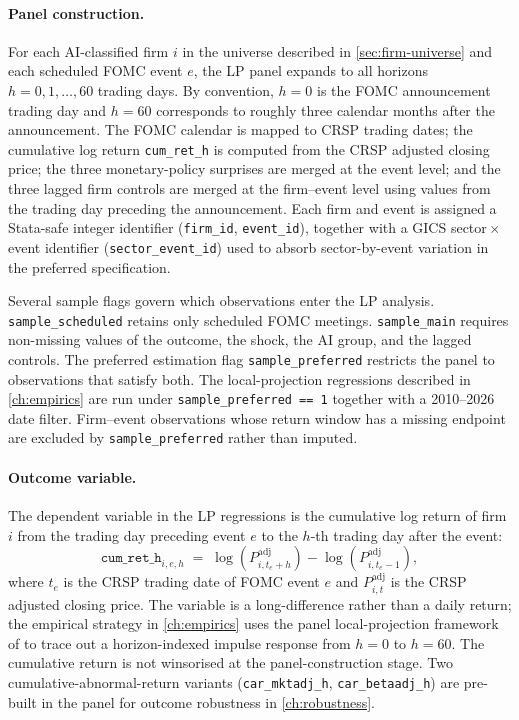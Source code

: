 \paragraph{Panel construction.} For each AI-classified firm $i$ in the universe described in \cref{sec:firm-universe} and each scheduled FOMC event $e$, the LP panel expands to all horizons $h = 0, 1, \dots, 60$ trading days. By convention, $h=0$ is the FOMC announcement trading day and $h=60$ corresponds to roughly three calendar months after the announcement. The FOMC calendar is mapped to CRSP trading dates; the cumulative log return \texttt{cum\_ret\_h} is computed from the CRSP adjusted closing price; the three monetary-policy surprises are merged at the event level; and the three lagged firm controls are merged at the firm--event level using values from the trading day preceding the announcement. Each firm and event is assigned a Stata-safe integer identifier (\texttt{firm\_id}, \texttt{event\_id}), together with a GICS sector\,$\times$\,event identifier (\texttt{sector\_event\_id}) used to absorb sector-by-event variation in the preferred specification.

Several sample flags govern which observations enter the LP analysis. \texttt{sample\_scheduled} retains only scheduled FOMC meetings. \texttt{sample\_main} requires non-missing values of the outcome, the shock, the AI group, and the lagged controls. The preferred estimation flag \texttt{sample\_preferred} restricts the panel to observations that satisfy both. The local-projection regressions described in \cref{ch:empirics} are run under \texttt{sample\_preferred == 1} together with a 2010--2026 date filter. Firm--event observations whose return window has a missing endpoint are excluded by \texttt{sample\_preferred} rather than imputed.

\paragraph{Outcome variable.} The dependent variable in the LP regressions is the cumulative log return of firm $i$ from the trading day preceding event $e$ to the $h$-th trading day after the event:
\begin{equation}
    \texttt{cum\_ret\_h}_{i,e,h} \;=\; \log\!\left(P^{\text{adj}}_{i,t_e+h}\right) - \log\!\left(P^{\text{adj}}_{i,t_e-1}\right),
    \label{eq:cum-ret}
\end{equation}
where $t_e$ is the CRSP trading date of FOMC event $e$ and $P^{\text{adj}}_{i,t}$ is the CRSP adjusted closing price. The variable is a long-difference rather than a daily return; the empirical strategy in \cref{ch:empirics} uses the panel local-projection framework of \citet{jorda2005} to trace out a horizon-indexed impulse response from $h=0$ to $h=60$. The cumulative return is not winsorised at the panel-construction stage. Two cumulative-abnormal-return variants (\texttt{car\_mktadj\_h}, \texttt{car\_betaadj\_h}) are pre-built in the panel for outcome robustness in \cref{ch:robustness}.

